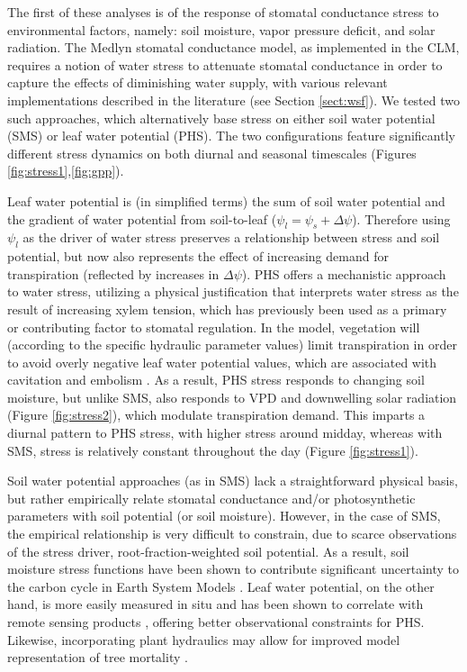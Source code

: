 \documentclass[draft,linenumbers]{agujournal}
\begin{document}
    The first of these analyses is of the response of stomatal conductance stress to environmental factors, namely: soil moisture, vapor pressure deficit, and solar radiation.
    The Medlyn stomatal conductance model, as implemented in the CLM, requires a notion of water stress to attenuate stomatal conductance in order to capture the effects of diminishing water supply,
    with various relevant implementations described in the literature (see Section \ref{sect:wsf}).
    We tested two such approaches, which alternatively base stress on either soil water potential (SMS) or leaf water potential (PHS).
    The two configurations feature significantly different stress dynamics on both diurnal and seasonal timescales (Figures \ref{fig:stress1},\ref{fig:gpp}).     
        
    Leaf water potential is (in simplified terms) the sum of soil water potential and the gradient of water potential from soil-to-leaf ($\psi_l=\psi_s+\Delta\psi$).
    Therefore using $\psi_l$ as the driver of water stress preserves a relationship between stress and soil potential, but now also represents the effect of increasing demand for transpiration (reflected by increases in $\Delta\psi$).
    PHS offers a mechanistic approach to water stress, utilizing a physical justification that interprets water stress as the result of increasing xylem tension, which has previously been used as a primary \citep{sperry2017} or contributing \citep{novick2016a} factor to stomatal regulation.
    In the model, vegetation will (according to the specific hydraulic parameter values) limit transpiration in order to avoid overly negative leaf water potential values, which are associated with cavitation and embolism \citep{tyree1989}.
    As a result, PHS stress responds to changing soil moisture, but unlike SMS, also responds to VPD and downwelling solar radiation (Figure \ref{fig:stress2}), which modulate transpiration demand.
        This imparts a diurnal pattern to PHS stress, with higher stress around midday, whereas with SMS, stress is relatively constant throughout the day (Figure \ref{fig:stress1}).

   
    Soil water potential approaches (as in SMS) lack a straightforward physical basis, but rather empirically relate stomatal conductance and/or photosynthetic parameters with soil potential (or soil moisture).
    However, in the case of SMS, the empirical relationship is very difficult to constrain, due to scarce observations of the stress driver, root-fraction-weighted soil potential.
    As a result, soil moisture stress functions have been shown to contribute significant uncertainty to the carbon cycle in Earth System Models \citep{trugman2018}.
    Leaf water potential, on the other hand, is more easily measured in situ \citep{boyer1967} and has been shown to correlate with remote sensing products \citep{momen2017}, offering better observational constraints for PHS.
    Likewise, incorporating plant hydraulics may allow for improved model representation of tree mortality \citep{mcdowell2018}.
\end{document}
